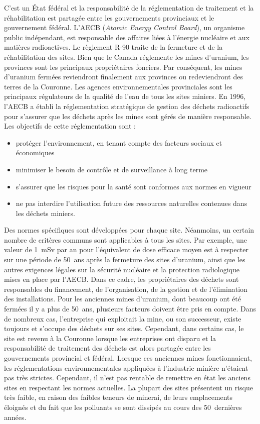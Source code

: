 \documentclass{article}
\begin{document}
C'est un État fédéral et la responsabilité de la réglementation de traitement et la réhabilitation est partagée entre les gouvernements provinciaux et le gouvernement fédéral.
L'AECB (\textit{Atomic Energy Control Board}), un organisme public indépendant, est responsable des affaires liées à l'énergie nucléaire et aux matières radioactives. Le règlement R-90 traite de la fermeture et de la réhabilitation des sites. Bien que le Canada réglemente les mines d'uranium, les provinces sont les principaux propriétaires fonciers. Par conséquent, les mines d'uranium fermées reviendront finalement aux provinces ou redeviendront des terres de la Couronne. Les agences environnementales provinciales sont les principaux régulateurs de la qualité de l'eau de tous les sites miniers.
En 1996, l'AECB a établi la réglementation stratégique de gestion des déchets radioactifs pour s'assurer que les déchets après les mines sont gérés de manière responsable. Les objectifs de cette réglementation sont :
\begin{itemize}
    \item protéger l'environnement, en tenant compte des facteurs sociaux et économiques
    \item minimiser le besoin de contrôle et de surveillance à long terme
    \item s'assurer que les risques pour la santé sont conformes aux normes en vigueur 
    \item ne pas interdire l'utilisation future des ressources naturelles contenues dans les déchets miniers.
\end{itemize}
Des normes spécifiques sont développées pour chaque site. Néanmoins, un certain nombre de critères communs sont applicables à tous les sites.
Par exemple, une valeur de 1~mSv par an pour l'équivalent de dose efficace moyen est à respecter sur une période de 50~ans après la fermeture des sites d'uranium, ainsi que les autres exigences légales sur la sécurité nucléaire et la protection radiologique mises en place par l'AECB.
Dans ce cadre, les propriétaires des déchets sont responsables du financement, de l'organisation, de la gestion et de l’élimination des installations.
Pour les anciennes mines d'uranium, dont beaucoup ont été fermées il y a plus de 50~ans, plusieurs facteurs doivent être pris en compte. Dans de nombreux cas, l'entreprise qui exploitait la mine, ou son successeur, existe toujours et s'occupe des déchets sur ses sites. Cependant, dans certains cas, le site est revenu à la Couronne lorsque les entreprises ont disparu et la responsabilité de traitement des déchets est alors partagée entre les gouvernements provincial et fédéral. Lorsque ces anciennes mines fonctionnaient, les réglementations environnementales appliquées à l'industrie minière n'étaient pas très strictes. Cependant, il n'est pas rentable de remettre en état les anciens sites en respectant les normes actuelles. La plupart des sites présentent un risque très faible, en raison des faibles teneurs de minerai, de leurs emplacements éloignés et du fait que les polluants se sont dissipés au cours des 50~dernières années.
\end{document}
